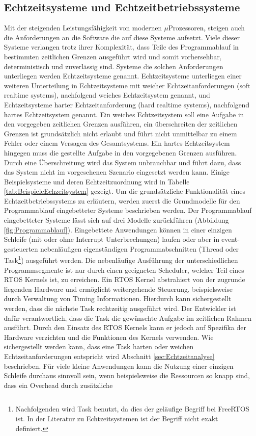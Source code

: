 \subsection{Echtzeitsysteme und Echtzeitbetriebssysteme}
\label{sec:Echtzeitsysteme}
Mit der steigenden Leis\-tungs\-fähig\-keit von modernen $\mu$\-Pro\-zesso\-ren, steigen auch die Anforderungen an die Software die auf diese Systeme aufsetzt. Viele dieser Systeme verlangen trotz ihrer Komplexität, dass Teile des Programmablauf in bestimmten zeitlichen Grenzen ausgeführt wird und somit vorhersehbar, deterministisch und zuverlässig sind. Systeme die solchen Anforderungen unterliegen werden Echtzeitsysteme genannt. Echtzeitsysteme unterliegen einer weiteren Unterteilung in Echtzeitsysteme mit weicher Echtzeitanforderungen (soft realtime systems), nachfolgend weiches Echtzeitsystem genannt, und Echtzeitsysteme harter Echtzeitanforderung (hard realtime systems), nachfolgend hartes Echtzeitsystem genannt. Ein weiches Echtzeitsystem soll eine Aufgabe in den vorgegeben zeitlichen Grenzen ausführen, ein über\-schreiten der zeitlichen Grenzen ist grundsätzlich nicht erlaubt und führt nicht unmittelbar zu einem Fehler oder einem Versagen des Gesamtsystems. Ein hartes Echtzeitsystem hingegen muss die gestellte Aufgabe in den vorgegebenen Grenzen aus\-füh\-ren. Durch eine Überschreitung wird das System unbrauchbar und führt dazu, dass das System nicht im vorgesehenen Szenario eingesetzt werden kann. Einige Beispielsysteme und deren Echtzeitzuordnung wird in Tabelle \ref{tab:BeispieleEchzeitsystem} gezeigt. Um die grundsätzliche Funktionalität eines Echtzeitbetriebssystems zu erläutern, werden zuerst die Grundmodelle für den Programmablauf eingebetteter Systeme beschrieben werden. Der Programmablauf eingebetteter Systeme lässt sich auf drei Modelle zurückführen (Abbildung \ref{fig:Programmablauf}). Eingebettete Anwendungen können in einer einzigen Schleife (mit oder ohne Interrupt Unterbrechungen) laufen oder aber in event-gesteuerten ne\-ben\-läuf\-igen ei\-gen\-stän\-dig\-en Programmabschnitten (Thre\-ad oder Task\footnote{Nachfolgenden wird Task benutzt, da dies der geläufige Begriff bei FreeRTOS ist. In der Literatur zu Echtzeitsystemen ist der Begriff nicht exakt definiert.}) ausgeführt werden. Die nebenläufige Aus\-füh\-rung der unterschiedlichen Programmsegmente ist nur durch einen geeigneten Scheduler, welcher Teil eines RTOS Kernels ist, zu erreichen. Ein RTOS Kernel abstrahiert von der zugrunde liegenden Hardware und ermöglicht weitergehende Steuerung, beispielsweise durch Verwaltung von Timing Informationen. Hierdurch kann sichergestellt werden, dass die nächste Task rechtzeitig ausgeführt wird. Der Entwickler ist dafür verantwortlich, dass die Task die gewünschte Aufgabe im zeitlichen Rahmen ausführt. Durch den Einsatz des RTOS Kernels kann er jedoch auf Spezifika der Hardware verzichten und die Funktionen des Kernels verwenden. Wie sichergestellt werden kann, dass eine Task  harten oder weichen Echtzeitanforderungen entspricht wird Abschnitt \ref{sec:Echtzeitanalyse} beschrieben. Für viele kleine Anwendungen kann die Nutzung einer einzigen Schleife durchaus sinnvoll sein, wenn beispielsweise die Ressourcen so knapp sind, dass ein Overhead durch zusätzliche 